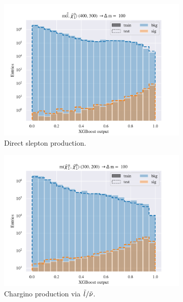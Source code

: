 \begin{figure}[H]
    \centering
    \begin{subfigure}[t!]{0.49\textwidth}
        \includegraphics[width = \textwidth]{Figures/SlepSlep/ML/BDT/Low_level/Low/scaled_train_test_395984.pdf}
        \caption{Direct slepton production.}
        \label{fig:}
    \end{subfigure}
    \begin{subfigure}[t!]{0.49\textwidth}
        \includegraphics[width = \textwidth]{Figures/SlepSnu/BDT/Low_level/Low/scaled_train_test_397115.pdf}
        \caption{Chargino production via $\Tilde{l}/\Tilde{\nu}$.}
        \label{fig:}
    \end{subfigure}
    \begin{subfigure}[t!]{0.49\textwidth}

\end{subfigure}
\end{figure}
